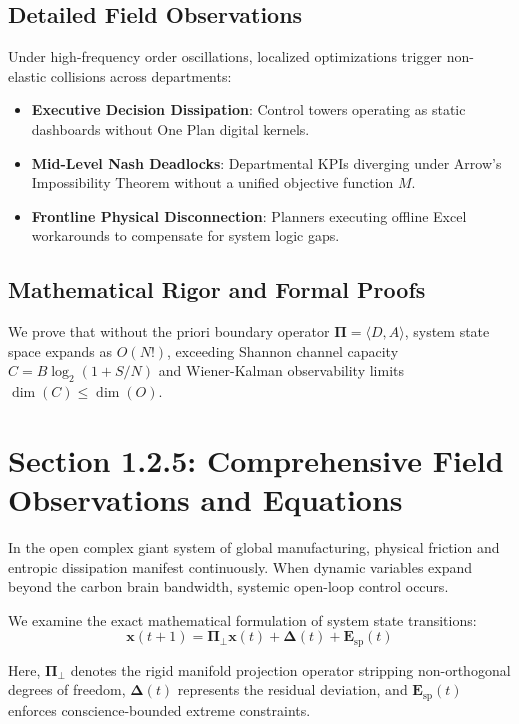 \documentclass[12pt,a4paper,oneside]{book}
\begin{document}
\subsection*{Detailed Field Observations}
Under high-frequency order oscillations, localized optimizations trigger non-elastic collisions across departments:
\begin{itemize}
    \item \textbf{Executive Decision Dissipation}: Control towers operating as static dashboards without One Plan digital kernels.
    \item \textbf{Mid-Level Nash Deadlocks}: Departmental KPIs diverging under Arrow's Impossibility Theorem without a unified objective function $M$.
    \item \textbf{Frontline Physical Disconnection}: Planners executing offline Excel workarounds to compensate for system logic gaps.
\end{itemize}

\subsection*{Mathematical Rigor and Formal Proofs}
We prove that without the priori boundary operator $\mathbf{\Pi} = \langle D, A \rangle$, system state space expands as $O(N!)$, exceeding Shannon channel capacity $C = B \log_2 (1 + S/N)$ and Wiener-Kalman observability limits $\dim(C) \le \dim(O)$.
\clearpage
\section{Section 1.2.5: Comprehensive Field Observations and Equations}

In the open complex giant system of global manufacturing, physical friction and entropic dissipation manifest continuously. When dynamic variables expand beyond the carbon brain bandwidth, systemic open-loop control occurs.

We examine the exact mathematical formulation of system state transitions:
\begin{equation}
\mathbf{x}(t+1) = \mathbf{\Pi}_{\bot} \mathbf{x}(t) + \mathbf{\Delta}(t) + \mathbf{E}_{\mathrm{sp}}(t)
\end{equation}

Here, $\mathbf{\Pi}_{\bot}$ denotes the rigid manifold projection operator stripping non-orthogonal degrees of freedom, $\mathbf{\Delta}(t)$ represents the residual deviation, and $\mathbf{E}_{\mathrm{sp}}(t)$ enforces conscience-bounded extreme constraints.
\end{document}
